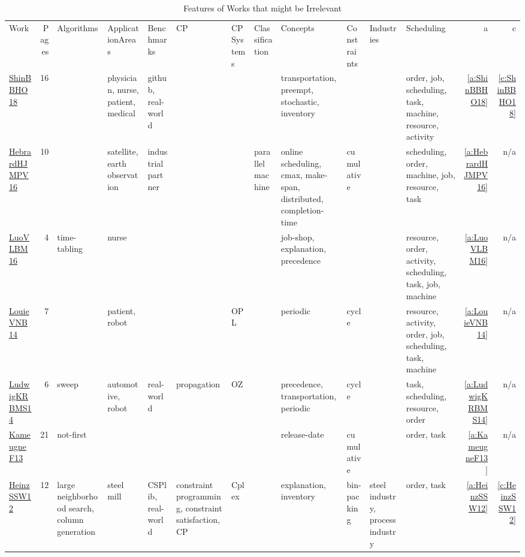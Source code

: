 {\scriptsize
\begin{longtable}{>{\raggedright\arraybackslash}p{3cm}r>{\raggedright\arraybackslash}p{1.5cm}>{\raggedright\arraybackslash}p{1.5cm}>{\raggedright\arraybackslash}p{1.5cm}>{\raggedright\arraybackslash}p{1.5cm}>{\raggedright\arraybackslash}p{1.5cm}>{\raggedright\arraybackslash}p{1.5cm}>{\raggedright\arraybackslash}p{1.5cm}>{\raggedright\arraybackslash}p{1.5cm}>{\raggedright\arraybackslash}p{1.5cm}>{\raggedright\arraybackslash}p{1.5cm}rr}
\rowcolor{white}\caption{Features of Works that might be Irrelevant}\\ \toprule
\rowcolor{white}Work & Pages & Algorithms& ApplicationAreas& Benchmarks& CP& CPSystems& Classification& Concepts& Constraints& Industries& Scheduling & a & c\\ \midrule\endhead
\bottomrule
\endfoot
\href{../works/ShinBBHO18.pdf}{ShinBBHO18}~\cite{ShinBBHO18} & 16 &  & physician, nurse, patient, medical & github, real-world &  &  &  & transportation, preempt, stochastic, inventory &  &  & order, job, scheduling, task, machine, resource, activity & \ref{a:ShinBBHO18} & \ref{c:ShinBBHO18}\\
\href{../works/HebrardHJMPV16.pdf}{HebrardHJMPV16}~\cite{HebrardHJMPV16} & 10 &  & satellite, earth observation & industrial partner &  &  & parallel machine & online scheduling, cmax, make-span, distributed, completion-time & cumulative &  & scheduling, order, machine, job, resource, task & \ref{a:HebrardHJMPV16} & n/a\\
\href{../works/LuoVLBM16.pdf}{LuoVLBM16}~\cite{LuoVLBM16} & 4 & time-tabling & nurse &  &  &  &  & job-shop, explanation, precedence &  &  & resource, order, activity, scheduling, task, job, machine & \ref{a:LuoVLBM16} & n/a\\
\href{../works/LouieVNB14.pdf}{LouieVNB14}~\cite{LouieVNB14} & 7 &  & patient, robot &  &  & OPL &  & periodic & cycle &  & resource, activity, order, job, scheduling, task, machine & \ref{a:LouieVNB14} & n/a\\
\href{../works/LudwigKRBMS14.pdf}{LudwigKRBMS14}~\cite{LudwigKRBMS14} & 6 & sweep & automotive, robot & real-world & propagation & OZ &  & precedence, transportation, periodic & cycle &  & task, scheduling, resource, order & \ref{a:LudwigKRBMS14} & n/a\\
\href{../works/KameugneF13.pdf}{KameugneF13}~\cite{KameugneF13} & 21 & not-first &  &  &  &  &  & release-date & cumulative &  & order, task & \ref{a:KameugneF13} & n/a\\
\href{../works/HeinzSSW12.pdf}{HeinzSSW12}~\cite{HeinzSSW12} & 12 & large neighborhood search, column generation & steel mill & CSPlib, real-world & constraint programming, constraint satisfaction, CP & Cplex &  & explanation, inventory & bin-packing & steel industry, process industry & order, task & \ref{a:HeinzSSW12} & \ref{c:HeinzSSW12}\\

\end{longtable}}
